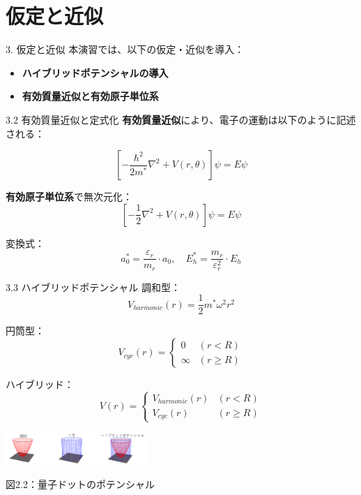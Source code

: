 \documentclass{beamer}
\begin{document}
\section{仮定と近似}
\begin{frame}{3. 仮定と近似}
本演習では、以下の仮定・近似を導入：

\begin{itemize}
\item \textbf{ハイブリッドポテンシャルの導入}
\item \textbf{有効質量近似と有効原子単位系}
\end{itemize}
\end{frame}

\begin{frame}{3.2 有効質量近似と定式化}
\textbf{有効質量近似}により、電子の運動は以下のように記述される：

\[
\left[ -\frac{\hbar^2}{2 m^*} \nabla^2 + V(r, \theta) \right] \psi = E \psi
\]

\textbf{有効原子単位系}で無次元化：
\[
\left[ -\frac{1}{2} \nabla^2 + V(r, \theta) \right] \psi = E \psi
\]

変換式：
\[
a_0^* = \frac{\varepsilon_r}{m_r} \cdot a_0,\quad E_h^* = \frac{m_r}{\varepsilon_r^2} \cdot E_h
\]
\end{frame}

\begin{frame}{3.3 ハイブリッドポテンシャル}
調和型：
\[
V_{harmonic}(r) = \frac{1}{2} m^* \omega^2 r^2
\]

円筒型：
\[
V_{cyc}(r) = 
\begin{cases}
0 & (r < R) \\
\infty & (r \geq R)
\end{cases}
\]

ハイブリッド：
\[
V(r) =
\begin{cases}
V_{harmonic}(r) & (r < R) \\
V_{cyc}(r) & (r \geq R)
\end{cases}
\]

\begin{center}
\includegraphics[width=0.4\textwidth]{images/三種盛り.png}

図2.2：量子ドットのポテンシャル
\end{center}
\end{frame}
\end{document}

